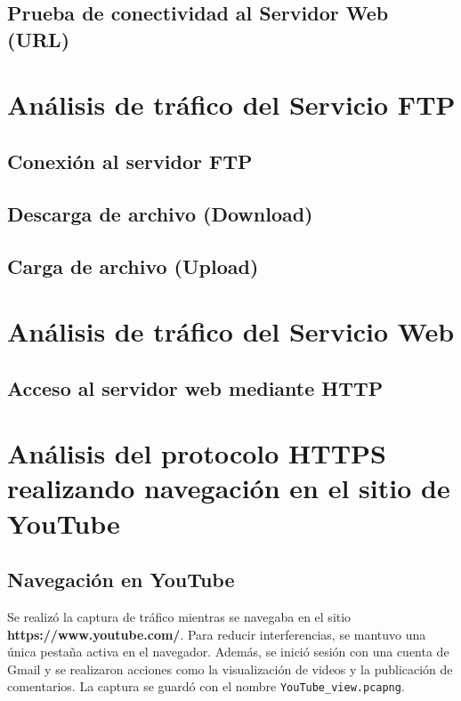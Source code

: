 \documentclass[10pt]{article}
\begin{document}
\subsection{Prueba de conectividad al Servidor Web (URL)}


\renewcommand{\thesection}{8.\arabic{section}}
\section{Análisis de tráfico del Servicio FTP}
\subsection{Conexión al servidor FTP}
\subsection{Descarga de archivo (Download)}
\subsection{Carga de archivo (Upload)}

\renewcommand{\thesection}{8.\arabic{section}}
\section{Análisis de tráfico del Servicio Web}
\subsection{Acceso al servidor web mediante HTTP}

\renewcommand{\thesection}{8.\arabic{section}}
\section{Análisis del protocolo HTTPS realizando navegación en el sitio de YouTube}

\subsection{Navegación en YouTube}
Se realizó la captura de tráfico mientras se navegaba en el sitio \textbf{https://www.youtube.com/}. 
Para reducir interferencias, se mantuvo una única pestaña activa en el navegador. 
Además, se inició sesión con una cuenta de Gmail y se realizaron acciones como la visualización de videos y la publicación de comentarios. 
La captura se guardó con el nombre \texttt{YouTube\_view.pcapng}.
\end{document}
